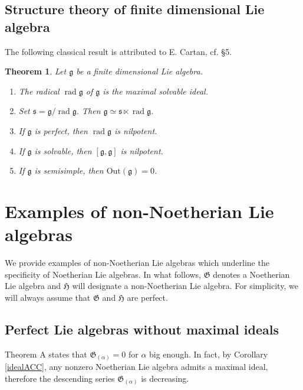 \documentclass[11pt, letterpaper, reqno]{amsart}
\newtheorem{theorem}{Theorem}
\theoremstyle{definition}
\newcommand{\rad}{\operatorname{rad}}
\newcommand{\fg}{\mathfrak{g}}
\newcommand{\fH}{\mathfrak{H}}
\newcommand{\fs}{\mathfrak{s}}
\newcommand{\fG}{\mathfrak{G}}
\newcommand{\Out}{\mathrm{Out}}
\begin{document}
\subsection{Structure theory of finite dimensional Lie algebra}


 The following classical result is attributed to E. Cartan, cf. 
 \cite{Bourbaki}{\S5}.

\begin{theorem} \label{cartan} Let $\fg$ be a finite dimensional Lie algebra.

\begin{enumerate}
\item[(a)]  The radical $\rad \fg$ of $\fg$ is the maximal solvable ideal.

\item[(b)] Set $\fs=\fg/\rad \fg$. Then
$\fg\simeq\fs\ltimes \rad \fg$.

\item[(c)] If $\fg$ is perfect, then $\rad \fg$ is nilpotent.

\item[(d)] If $\fg$ is solvable, then $[\fg,\fg]$ is nilpotent.

\item[(e)] If $\fg$ is semisimple, then $\Out(\fg)=0$.
\end{enumerate}
\end{theorem}




\section{Examples of non-Noetherian Lie algebras}\label{counter}



We provide examples of  non-Noetherian Lie algebras which
underline the specificity of Noetherian Lie algebras.
In what follows, $\fG$ denotes a Noetherian Lie algebra
and $\fH$ will designate a non-Noetherian Lie algebra.
For simplicity, we will always assume that $\fG$ and $\fH$ are perfect.

\subsection{Perfect Lie algebras without maximal ideals}

Theorem A states that   $\fG_{(\alpha)}=0$ for $\alpha$ big enough.
In fact, by Corollary \ref{idealACC}, any nonzero Noetherian Lie algebra admits a maximal ideal, therefore the descending series
$\fG_{(\alpha)}$ is decreasing.
\end{document}
